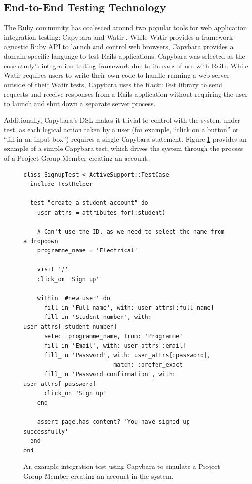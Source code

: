 \documentclass[document.tex]{subfiles}
\begin{document}
\subsection {End-to-End Testing Technology}

The Ruby community has coalesced around two popular tools for web application integration testing: Capybara \cite{capybara} and Watir \cite{watir}. While Watir provides a framework-agnostic Ruby API to launch and control web browsers, Capybara provides a domain-specific language to test Rails applications. Capybara was selected as the case study's integration testing framework due to its ease of use with Rails. While Watir requires users to write their own code to handle running a web server outside of their Watir tests, Capybara uses the Rack::Test library to send requests and receive responses from a Rails application without requiring the user to launch and shut down a separate server process.

Additionally, Capybara's DSL makes it trivial to control with the system under test, as each logical action taken by a user (for example, ``click on a button'' or ``fill in an input box'') requires a single Capybara statement. Figure \ref{fig:4ys-test-signup} provides an example of a simple Capybara test, which drives the system through the process of a Project Group Member creating an account.

\begin{figure}[!ht]
  \begin{lstlisting}
class SignupTest < ActiveSupport::TestCase
  include TestHelper

  test "create a student account" do
    user_attrs = attributes_for(:student)

    # Can't use the ID, as we need to select the name from a dropdown
    programme_name = 'Electrical'

    visit '/'
    click_on 'Sign up'

    within '#new_user' do
      fill_in 'Full name', with: user_attrs[:full_name]
      fill_in 'Student number', with: user_attrs[:student_number]
      select programme_name, from: 'Programme'
      fill_in 'Email', with: user_attrs[:email]
      fill_in 'Password', with: user_attrs[:password],
                          match: :prefer_exact
      fill_in 'Password confirmation', with: user_attrs[:password]
      click_on 'Sign up'
    end

    assert page.has_content? 'You have signed up successfully'
  end
end
  \end{lstlisting}
  \cprotect \caption{An example integration test using Capybara to simulate a Project Group Member creating an account in the system.}
  \label{fig:4ys-test-signup}
\end{figure}
\end{document}
